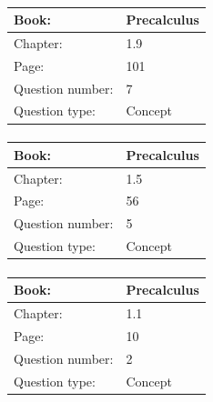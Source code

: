 \documentclass{article}
\begin{document}
            \paragraph{}
            \begin{tabularx}{1\textwidth}{
                    p{}
                    p{}
                }
                \toprule
                Book: & Precalculus
                \\
                \midrule
                Chapter: & 1.9
                \\
                \midrule
                Page: & 101
                \\
                \midrule
                Question number: & 7
                \\
                \midrule
                Question type: & Concept
                \\
                \bottomrule
            \end{tabularx}
            
            \paragraph{}
            \begin{tabularx}{1\textwidth}{
                    p{}
                    p{}
                }
                \toprule
                Book: & Precalculus
                \\
                \midrule
                Chapter: & 1.5
                \\
                \midrule
                Page: & 56
                \\
                \midrule
                Question number: & 5
                \\
                \midrule
                Question type: & Concept
                \\
                \bottomrule
            \end{tabularx}
            
            \paragraph{}
            \begin{tabularx}{1\textwidth}{
                    p{}
                    p{}
                }
                \toprule
                Book: & Precalculus
                \\
                \midrule
                Chapter: & 1.1
                \\
                \midrule
                Page: & 10
                \\
                \midrule
                Question number: & 2
                \\
                \midrule
                Question type: & Concept
                \\
                \bottomrule
            \end{tabularx}
            
\end{document}

